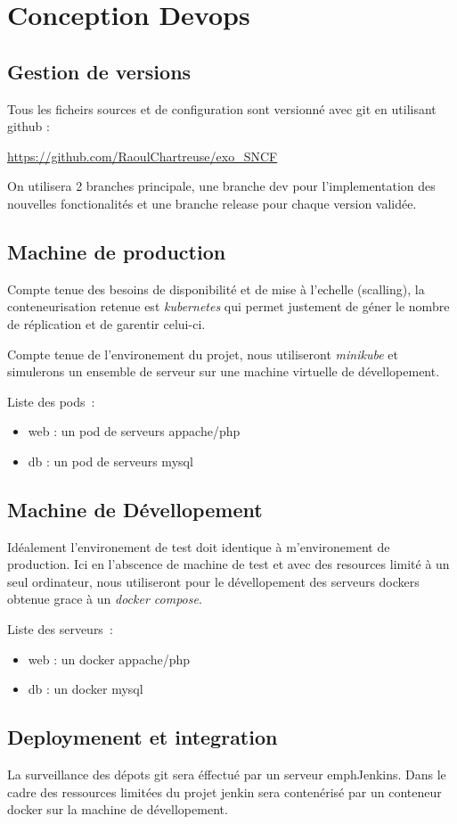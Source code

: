 \section{Conception Devops}
\subsection{Gestion de versions}
Tous les ficheirs sources et de configuration sont versionné avec git en utilisant github :

\url{https://github.com/RaoulChartreuse/exo_SNCF}


On utilisera 2 branches principale, une branche dev pour l'implementation des nouvelles fonctionalités et une branche release pour chaque version validée.

\subsection{Machine de production}
Compte tenue des besoins de disponibilité et de mise à l'echelle (scalling), la conteneurisation retenue est \emph{kubernetes} qui permet justement de géner le nombre de réplication et de garentir celui-ci.

Compte tenue de l'environement du projet, nous utiliseront \emph{minikube} et simulerons un ensemble de serveur sur une machine virtuelle de dévellopement.

Liste des pods~:
\begin{itemize}
\item web : un pod de serveurs appache/php
\item db : un pod de serveurs mysql
\end{itemize}

\subsection{Machine de Dévellopement}
Idéalement l'environement de test doit identique à m'environement de production. Ici en l'abscence de machine de test et avec des resources limité à un seul ordinateur, nous utiliseront pour le dévellopement des serveurs dockers obtenue grace à un \emph{docker compose}.

Liste des serveurs~:
\begin{itemize}
\item web : un docker appache/php
\item db : un docker mysql
\end{itemize}

\subsection{Deploymenent et integration}
La surveillance des dépots git sera éffectué par un serveur emph{Jenkins}. Dans le cadre des ressources limitées du projet jenkin sera contenérisé par un conteneur docker sur la machine de dévellopement.

